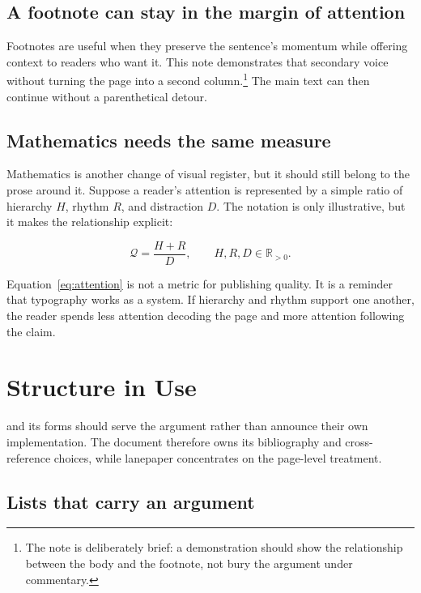 \documentclass[11pt]{article}
\begin{document}
\subsection{A footnote can stay in the margin of attention}
\label{subsec:footnote}

Footnotes are useful when they preserve the sentence's momentum while offering
context to readers who want it.
This note demonstrates that secondary voice without turning the page into a
second column.\footnote{The note is deliberately brief: a demonstration should
show the relationship between the body and the footnote, not bury the argument
under commentary.}
The main text can then continue without a parenthetical detour.

\subsection{Mathematics needs the same measure}
\label{subsec:mathematics}

Mathematics is another change of visual register, but it should still belong to
the prose around it.
Suppose a reader's attention is represented by a simple ratio of hierarchy
\(H\), rhythm \(R\), and distraction \(D\).
The notation is only illustrative, but it makes the relationship explicit:

\begin{equation}
  \mathcal{Q} = \frac{H + R}{D},
  \qquad H, R, D \in \mathbb{R}_{>0}.
  \label{eq:attention}
\end{equation}

Equation~\eqref{eq:attention} is not a metric for publishing quality.
It is a reminder that typography works as a system.
If hierarchy and rhythm support one another, the reader spends less attention
decoding the page and more attention following the claim.

\section{Structure in Use}
\label{sec:structure}

 and its forms should
serve the argument rather than announce their own implementation.
The document therefore owns its bibliography and cross-reference choices,
while lanepaper concentrates on the page-level treatment.

\subsection{Lists that carry an argument}
\label{subsec:lists}
\end{document}
